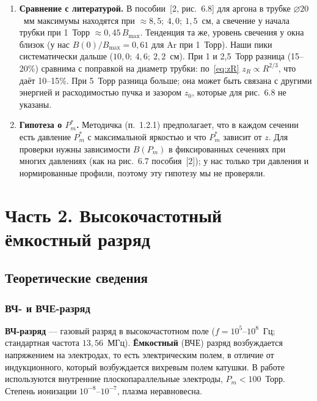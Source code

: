 \documentclass[12pt,a4paper]{article}
\begin{document}
\begin{enumerate}
  \item \textbf{Сравнение с литературой.} В пособии~[2, рис.~6.8] для
        аргона в трубке $\varnothing 20$~мм максимумы находятся при
        $\approx 8{,}5;\ 4{,}0;\ 1{,}5$~см, а свечение у начала трубки при
        1~Торр $\approx 0{,}45\,B_\text{max}$. Тенденция та же, уровень
        свечения у окна близок (у нас $B(0)/B_\text{max} = 0{,}61$ для Ar
        при 1~Торр). Наши пики систематически дальше
        ($10{,}0;\ 4{,}6;\ 2{,}2$~см). При 1 и 2,5~Торр разница
        (15--20\%) сравнима с поправкой на диаметр трубки: по~\eqref{eq:zR}
        $z_R \propto R^{2/3}$, что даёт 10--15\%. При 5~Торр разница
        больше; она может быть связана с другими энергией и
        расходимостью пучка и зазором $z_0$, которые для рис.~6.8 не
        указаны.
  \item \textbf{Гипотеза о $P_m^*$.} Методичка (п.~1.2.1) предполагает,
        что в каждом сечении есть давление $P_m^*$ с максимальной яркостью
        и что $P_m^*$ зависит от $z$. Для проверки нужны зависимости
        $B(P_m)$ в фиксированных сечениях при многих давлениях (как на
        рис.~6.7 пособия~[2]); у нас только три давления и нормированные
        профили, поэтому эту гипотезу мы не проверяли.
\end{enumerate}

\section{Часть 2. Высокочастотный ёмкостный разряд}

\subsection{Теоретические сведения}

\subsubsection{ВЧ- и ВЧЕ-разряд}

\textbf{ВЧ-разряд} --- газовый разряд в высокочастотном поле
($f = 10^5$--$10^8$~Гц; стандартная частота $13{,}56$~МГц).
\textbf{Ёмкостный} (ВЧЕ) разряд возбуждается напряжением на электродах,
то есть электрическим полем, в отличие от индукционного, который
возбуждается вихревым полем катушки. В работе используются внутренние
плоскопараллельные электроды, $P_m < 100$~Торр. Степень ионизации
$10^{-8}$--$10^{-7}$, плазма неравновесна.
\end{document}
